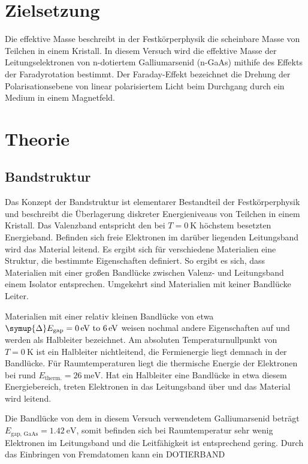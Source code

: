 \section{Zielsetzung}
\label{sec:Zielsetzung}
Die effektive Masse beschreibt in der Festkörperphysik die scheinbare Masse von Teilchen in einem Kristall. In diesem Versuch wird die effektive Masse der Leitungselektronen von
n-dotiertem Galliumarsenid (n-GaAs) mithife des Effekts der Faradyrotation bestimmt. Der Faraday-Effekt bezeichnet die Drehung der Polarisationsebene von linear polarisiertem Licht
beim Durchgang durch ein Medium in einem Magnetfeld.

\section{Theorie}
\label{sec:Theorie}
\subsection{Bandstruktur}
\label{subsec:Bandstruktur}
Das Konzept der Bandstruktur ist elementarer Bestandteil der Festkörperphysik und beschreibt die Überlagerung diskreter Energieniveaus von Teilchen in einem Kristall. Das Valenzband
entspricht den bei $T=\qty{0}{\kelvin}$ höchstem besetzten Energieband. Befinden sich freie Elektronen im darüber liegenden Leitungsband wird das Material leitend.
Es ergibt sich für verschiedene Materialien eine Struktur, die bestimmte Eigenschaften definiert. So ergibt es sich, dass Materialien mit einer großen Bandlücke zwischen 
Valenz- und Leitungsband einem Isolator entsprechen. Umgekehrt sind Materialien mit keiner Bandlücke Leiter.

Materialien mit einer relativ kleinen Bandlücke von etwa $\symup{\Delta}E_{\text{gap}}=\qtyrange{0}{6}{\electronvolt}$ weisen nochmal andere Eigenschaften auf und werden als Halbleiter
bezeichnet. Am absoluten Temperaturnullpunkt von $T=\qty{0}{\kelvin}$ ist ein Halbleiter nichtleitend, die Fermienergie liegt demnach in der Bandlücke. Für Raumtemperaturen liegt die
thermische Energie der Elektronen bei rund $E_{\text{therm.}}=\qty{26}{\milli\electronvolt}$. Hat ein Halbleiter eine Bandlücke in etwa diesem Energiebereich, treten Elektronen in das 
Leitungsband über und das Material wird leitend.

Die Bandlücke von dem in diesem Versuch verwendetem Galliumarsenid beträgt $E_{\text{gap, GaAs}} = \qty{1,42}{\electronvolt}$, somit befinden sich bei Raumtemperatur sehr wenig 
Elektronen im Leitungsband und die Leitfähigkeit ist entsprechend gering. Durch das Einbringen von Fremdatomen kann ein DOTIERBAND 

